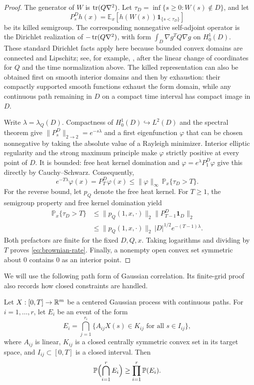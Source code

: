 \begin{proof}
The generator of $W$ is $\operatorname{tr}(Q\nabla^2)$.  Let
$\tau_D=\inf\{s\ge0:W(s)\notin D\}$, and let
\[
 P_s^D h(x)=\mathbb E_x[h(W(s))\mathbf 1_{\{s<\tau_D\}}]
\]
be its killed semigroup.  The corresponding nonnegative self-adjoint
operator is the Dirichlet realization of $-\operatorname{tr}(Q\nabla^2)$, with form
$\int_D\nabla g^TQ\nabla g$ on $H_0^1(D)$.
These standard Dirichlet facts apply here because bounded convex domains
are connected and Lipschitz; see, for example,
\cite[Section~2 and Appendix~C]{DaviesSimon1984}, after the linear change
of coordinates for $Q$ and the time normalization above.
The killed representation can also be obtained first on smooth interior
domains and then by exhaustion: their compactly supported smooth
functions exhaust the form domain, while any continuous path remaining
in $D$ on a compact time interval has compact image in $D$.

Write $\lambda=\lambda_Q(D)$.  Compactness of
$H_0^1(D)\hookrightarrow L^2(D)$ and the spectral theorem give
$\lVert P_s^D\rVert_{2\to2}=e^{-s\lambda}$ and a first eigenfunction
$\varphi$ that can be chosen nonnegative by taking the absolute value
of a Rayleigh minimizer.  Interior elliptic regularity and the strong
maximum principle make $\varphi$ strictly positive at every point of $D$.
It is bounded: free heat
kernel domination and
$\varphi=e^\lambda P_1^D\varphi$ give this directly by
Cauchy--Schwarz.  Consequently,
\[
 e^{-T\lambda}\varphi(x)
 =P_T^D\varphi(x)
 \le \lVert\varphi\rVert_\infty\,
       \mathbb P_x\{\tau_D>T\}.
\]
For the reverse bound, let $p_Q$ denote the free heat kernel.  For $T\ge1$,
the semigroup property and free kernel domination yield
\begin{align*}
 \mathbb P_x\{\tau_D>T\}
 &\le \lVert p_Q(1,x,\cdot)\rVert_2
           \lVert P_{T-1}^D\mathbf 1_D\rVert_2\\
 &\le \lVert p_Q(1,x,\cdot)\rVert_2\,|D|^{1/2}
           e^{-(T-1)\lambda}.
\end{align*}
Both prefactors are finite for the fixed $D,Q,x$.
Taking logarithms and dividing by $T$ proves
\eqref{eq:brownian-rate}.  Finally, a nonempty open convex set symmetric
about $0$ contains $0$ as an interior point.
\end{proof}

We will use the following path form of Gaussian correlation.  Its
finite-grid proof also records how closed constraints are handled.

\begin{lemma}
\label{lem:gaussian-path-correlation}
Let $X:[0,T]\to\mathbb R^m$ be a centered Gaussian process with continuous paths.
For $i=1,\ldots,r$, let $E_i$ be an event of the form
\[
 E_i=\bigcap_{j=1}^{r_i}
 \{A_{ij}X(s)\in K_{ij}\text{ for all }s\in I_{ij}\},
\]
where $A_{ij}$ is linear, $K_{ij}$ is a closed centrally symmetric convex
set in its target space, and $I_{ij}\subset[0,T]$ is a closed interval.
Then
\[
 \mathbb P\Bigl(\bigcap_{i=1}^r E_i\Bigr)
 \ge \prod_{i=1}^r\mathbb P(E_i).
\]
\end{lemma}

